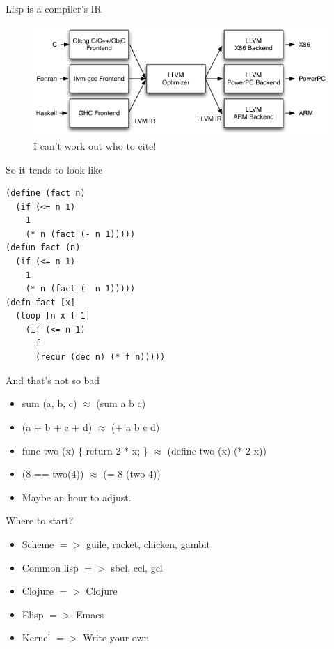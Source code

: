 \documentclass[20pt]{beamer}
\begin{document}
\begin{frame}{Lisp is a compiler's IR}
  \begin{figure}
    \includegraphics[height=4.2cm]{LLVMCompiler1.png}
    \caption{I can't work out who to cite!}
  \end{figure}
\end{frame}

\begin{frame}[fragile]{So it tends to look like}
  \begin{lstlisting}
(define (fact n)
  (if (<= n 1)
    1
    (* n (fact (- n 1)))))
(defun fact (n)
  (if (<= n 1)
    1
    (* n (fact (- n 1)))))
(defn fact [x]
  (loop [n x f 1]
    (if (<= n 1)
      f
      (recur (dec n) (* f n)))))
  \end{lstlisting}
\end{frame}

\begin{frame}{And that's not so bad}
  \begin{itemize}
  \item sum (a, b, c) $\approx$ (sum a b c)
  \item (a + b + c + d) $\approx$ (+ a b c d)
  \item func two (x) \{ return 2 * x; \} $\approx$ (define two (x) (* 2 x))
  \item (8 == two(4)) $\approx$ (= 8 (two 4))
  \item Maybe an hour to adjust.
  \end{itemize}
\end{frame}

\begin{frame}{Where to start?}
  \begin{itemize}
  \item Scheme $=>$ guile, racket, chicken, gambit
  \item Common lisp $=>$ sbcl, ccl, gcl
  \item Clojure $=>$ Clojure
  \item Elisp $=>$ Emacs
  \item Kernel $=>$ Write your own
  \end{itemize}
\end{frame}
\end{document}
